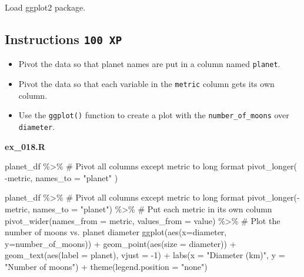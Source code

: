 \documentclass[
  letterpaper,
  DIV=11,
  numbers=noendperiod]{scrreprt}
\newenvironment{Shaded}{\begin{snugshade}}{\end{snugshade}}
\newcommand{\AttributeTok}[1]{\textcolor[rgb]{0.40,0.45,0.13}{#1}}
\newcommand{\CommentTok}[1]{\textcolor[rgb]{0.37,0.37,0.37}{#1}}
\newcommand{\DecValTok}[1]{\textcolor[rgb]{0.68,0.00,0.00}{#1}}
\newcommand{\FunctionTok}[1]{\textcolor[rgb]{0.28,0.35,0.67}{#1}}
\newcommand{\NormalTok}[1]{\textcolor[rgb]{0.00,0.23,0.31}{#1}}
\newcommand{\SpecialCharTok}[1]{\textcolor[rgb]{0.37,0.37,0.37}{#1}}
\newcommand{\StringTok}[1]{\textcolor[rgb]{0.13,0.47,0.30}{#1}}
\providecommand{\tightlist}{%
  \setlength{\itemsep}{0pt}\setlength{\parskip}{0pt}}\usepackage{longtable,booktabs,array}
\begin{document}
Load ggplot2 package.

\hypertarget{instructions-100-xp-15}{%
\subsection*{\texorpdfstring{Instructions
\texttt{100\ XP}}{Instructions 100 XP}}\label{instructions-100-xp-15}}

\begin{itemize}
\tightlist
\item
  Pivot the data so that planet names are put in a column named
  \texttt{planet}.
\item
  Pivot the data so that each variable in the \texttt{metric} column
  gets its own column.
\item
  Use the \texttt{ggplot()} function to create a plot with the
  \texttt{number\_of\_moons} over \texttt{diameter}.
\end{itemize}

\textbf{ex\_018.R}

\begin{Shaded}
\begin{Highlighting}[]

\NormalTok{planet\_df }\SpecialCharTok{\%\textgreater{}\%}
  \CommentTok{\# Pivot all columns except metric to long format}
  \FunctionTok{pivot\_longer}\NormalTok{(}
    \SpecialCharTok{{-}}\NormalTok{metric, }
    \AttributeTok{names\_to =} \StringTok{"planet"}
\NormalTok{  )}

\NormalTok{planet\_df }\SpecialCharTok{\%\textgreater{}\%}
  \CommentTok{\# Pivot all columns except metric to long format}
  \FunctionTok{pivot\_longer}\NormalTok{(}\SpecialCharTok{{-}}\NormalTok{metric, }\AttributeTok{names\_to =} \StringTok{"planet"}\NormalTok{) }\SpecialCharTok{\%\textgreater{}\%} 
  \CommentTok{\# Put each metric in its own column}
  \FunctionTok{pivot\_wider}\NormalTok{(}\AttributeTok{names\_from =}\NormalTok{ metric, }\AttributeTok{values\_from =}\NormalTok{ value) }\SpecialCharTok{\%\textgreater{}\%} 
  \CommentTok{\# Plot the number of moons vs. planet diameter}
  \FunctionTok{ggplot}\NormalTok{(}\FunctionTok{aes}\NormalTok{(}\AttributeTok{x=}\NormalTok{diameter, }\AttributeTok{y=}\NormalTok{number\_of\_moons)) }\SpecialCharTok{+}
  \FunctionTok{geom\_point}\NormalTok{(}\FunctionTok{aes}\NormalTok{(}\AttributeTok{size =}\NormalTok{ diameter)) }\SpecialCharTok{+}
  \FunctionTok{geom\_text}\NormalTok{(}\FunctionTok{aes}\NormalTok{(}\AttributeTok{label =}\NormalTok{ planet), }\AttributeTok{vjust =} \SpecialCharTok{{-}}\DecValTok{1}\NormalTok{) }\SpecialCharTok{+}
  \FunctionTok{labs}\NormalTok{(}\AttributeTok{x =} \StringTok{"Diameter (km)"}\NormalTok{, }\AttributeTok{y =} \StringTok{"Number of moons"}\NormalTok{) }\SpecialCharTok{+}
  \FunctionTok{theme}\NormalTok{(}\AttributeTok{legend.position =} \StringTok{"none"}\NormalTok{)}

\end{Highlighting}
\end{Shaded}
\end{document}
